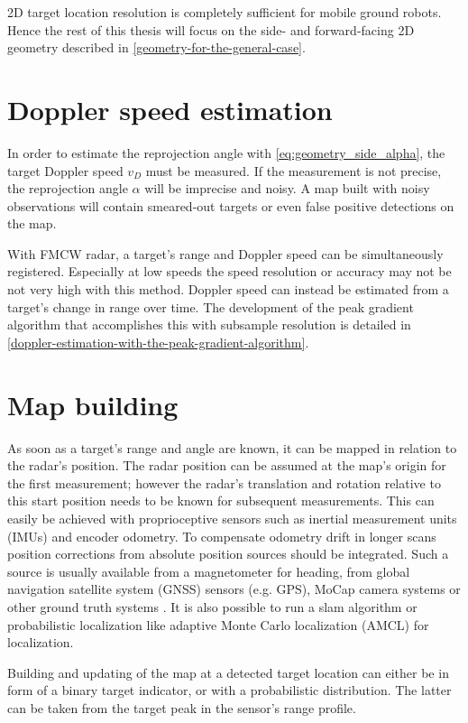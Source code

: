 2D target location resolution is completely sufficient for mobile ground robots. Hence the rest of this thesis will focus on the side- and forward-facing 2D geometry described in \cref{geometry-for-the-general-case}.

\section{Doppler speed estimation}\label{doppler-speed-estimation}

In order to estimate the reprojection angle with \cref{eq:geometry_side_alpha}, the target Doppler speed $v_D$ must be measured. If the measurement is not precise, the reprojection angle \(\alpha\) will be imprecise and noisy. A map built with noisy observations will contain smeared-out targets or even false positive detections on the map.

With FMCW radar, a target's range and Doppler speed can be simultaneously registered. Especially at low speeds the speed resolution or accuracy may not be not very high with this method. Doppler speed can instead be estimated from a target's change in range over time. The development of the peak gradient algorithm that accomplishes this with subsample resolution is detailed in \cref{doppler-estimation-with-the-peak-gradient-algorithm}.

\section{Map building}\label{reprojection-method}

As soon as a target's range and angle are known, it can be mapped in relation
to the radar's position. The radar position can be assumed at the map's origin for the first measurement; however the radar's translation and rotation relative to this start position needs to be known for subsequent measurements. This can easily be achieved with proprioceptive sensors such as inertial measurement units (IMUs) and encoder odometry. To compensate odometry drift in longer scans position corrections from absolute position sources should be integrated. Such a source is usually available from a magnetometer for heading, from global navigation satellite system (GNSS) sensors (e.g. GPS), MoCap camera systems or other ground truth systems \cite{Godil2013}. It is also possible to run a slam algorithm or probabilistic localization like adaptive Monte Carlo localization (AMCL) for localization.

Building and updating of the map at a detected target location can either be in form of a binary target indicator, or with a probabilistic distribution. The latter can be taken from the target peak in the sensor's range profile.

